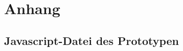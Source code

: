 \section{Anhang}
\label{sec:Anhang}

\subsection{Javascript-Datei des Prototypen}
\label{sec:AnhangJavascriptPrototyp}
